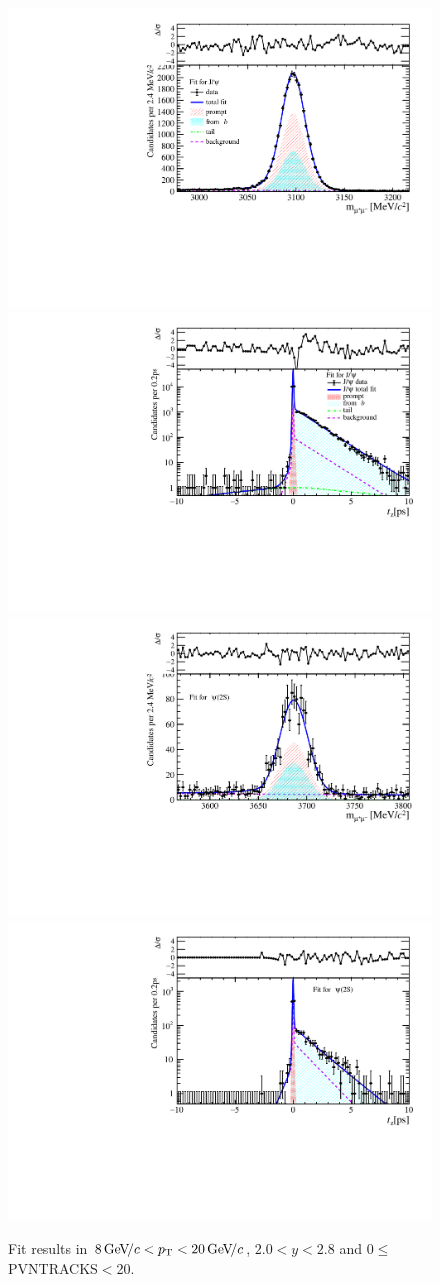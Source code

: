 \begin{figure}[H]
\begin{center}
\includegraphics[width=0.47\linewidth]{pdf/Jpsi/drawmass/n1y1pt5.pdf}
\includegraphics[width=0.47\linewidth]{pdf/Jpsi/2DFit/n1y1pt5.pdf}
\vspace*{-0.5cm}
\includegraphics[width=0.47\linewidth]{pdf/Psi2S/drawmass/n1y1pt5.pdf}
\includegraphics[width=0.47\linewidth]{pdf/Psi2S/2DFit/n1y1pt5.pdf}
\vspace*{-0.5cm}
\end{center}
\caption{Fit results in $8\text{\,Ge\kern -0.1em V\!/}c<p_{\mathrm{T}}<20\text{\,Ge\kern -0.1em V\!/}c$, $2.0<y<2.8$ and 0$\leq$PVNTRACKS$<$20.}
\label{Fitn1y1pt5}
\end{figure}

